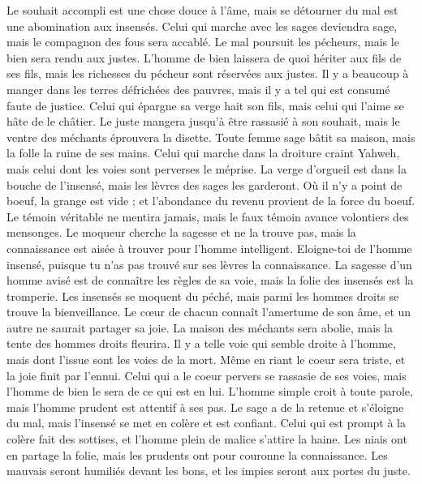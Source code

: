 \begin{multicols}{2}
Le souhait accompli est une chose douce à l'âme, mais se détourner du mal est une abomination aux insensés.
Celui qui marche avec les sages deviendra sage, mais le compagnon des fous sera accablé.
Le mal poursuit les pécheurs, mais le bien sera rendu aux justes.
L'homme de bien laissera de quoi hériter aux fils de ses fils, mais les richesses du pécheur sont réservées aux justes.
Il y a beaucoup à manger dans les terres défrichées des pauvres, mais il y a tel qui est consumé faute de justice.
Celui qui épargne sa verge hait son fils, mais celui qui l'aime se hâte de le châtier.
Le juste mangera jusqu'à être rassasié à son souhait, mais le ventre des méchants éprouvera la disette.
\VerseOne{}Toute femme sage bâtit sa maison, mais la folle la ruine de ses mains.
Celui qui marche dans la droiture craint Yahweh, mais celui dont les voies sont perverses le méprise.
La verge d'orgueil est dans la bouche de l’insensé, mais les lèvres des sages les garderont.
Où il n'y a point de boeuf, la grange est vide ; et l'abondance du revenu provient de la force du boeuf.
Le témoin véritable ne mentira jamais, mais le faux témoin avance volontiers des mensonges.
Le moqueur cherche la sagesse et ne la trouve pas, mais la connaissance est aisée à trouver pour l'homme intelligent.
Eloigne-toi de l'homme insensé, puisque tu n’as pas trouvé sur ses lèvres la connaissance.
La sagesse d’un homme avisé est de connaître les règles de sa voie, mais la folie des insensés est la tromperie.
Les insensés se moquent du péché, mais parmi les hommes droits se trouve la bienveillance.
Le cœur de chacun connaît l'amertume de son âme, et un autre ne saurait partager sa joie.
La maison des méchants sera abolie, mais la tente des hommes droits fleurira.
Il y a telle voie qui semble droite à l'homme, mais dont l'issue sont les voies de la mort.
Même en riant le coeur sera triste, et la joie finit par l'ennui.
Celui qui a le coeur pervers se rassasie de ses voies, mais l'homme de bien le sera de ce qui est en lui.
L’homme simple croit à toute parole, mais l'homme prudent est attentif à ses pas.
Le sage a de la retenue et s’éloigne du mal, mais l’insensé se met en colère et est confiant.
Celui qui est prompt à la colère fait des sottises, et l'homme plein de malice s’attire la haine.
Les niais ont en partage la folie, mais les prudents ont pour couronne la connaissance.
Les mauvais seront humiliés devant les bons, et les impies seront aux portes du juste.

\end{multicols}
